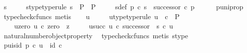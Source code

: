 \begin{isabellebody}
\ s{\isacharprime}{\kern0pt}\ \isanewline
\ \ \ \ s{\isacharprime}{\kern0pt}{\isacharunderscore}{\kern0pt}type{\isacharbrackleft}{\kern0pt}type{\isacharunderscore}{\kern0pt}rule{\isacharbrackright}{\kern0pt}{\isacharcolon}{\kern0pt}\ {\isachardoublequoteopen}s{\isacharprime}{\kern0pt}\ {\isacharcolon}{\kern0pt}\ P\ {\isasymrightarrow}\ P{\isachardoublequoteclose}\ \isanewline
\ \ \ \ s{\isacharprime}{\kern0pt}{\isacharunderscore}{\kern0pt}def{\isacharcolon}{\kern0pt}\ {\isachardoublequoteopen}p{\isacharprime}{\kern0pt}\ {\isasymcirc}\isactrlsub c\ s{\isacharprime}{\kern0pt}\ {\isacharequal}{\kern0pt}\ successor\ {\isasymcirc}\isactrlsub c\ p{\isacharprime}{\kern0pt}{\isachardoublequoteclose}\isanewline
\ \ \ \ \isamarkupfalse%
\ p{\isacharprime}{\kern0pt}{\isacharunderscore}{\kern0pt}uni{\isacharunderscore}{\kern0pt}prop\ \isamarkupfalse%
\ {\isacharparenleft}{\kern0pt}typecheck{\isacharunderscore}{\kern0pt}cfuncs{\isacharcomma}{\kern0pt}\ metis{\isacharparenright}{\kern0pt}\isanewline
\isanewline
\ \ \isamarkupfalse%
\ u\ \isanewline
\ \ \ \ u{\isacharunderscore}{\kern0pt}type{\isacharbrackleft}{\kern0pt}type{\isacharunderscore}{\kern0pt}rule{\isacharbrackright}{\kern0pt}{\isacharcolon}{\kern0pt}\ {\isachardoublequoteopen}u\ {\isacharcolon}{\kern0pt}\ {\isasymnat}\isactrlsub c\ {\isasymrightarrow}\ P{\isachardoublequoteclose}\ \isanewline
\ \ \ \ u{\isacharunderscore}{\kern0pt}zero{\isacharcolon}{\kern0pt}\ {\isachardoublequoteopen}u\ {\isasymcirc}\isactrlsub c\ zero\ {\isacharequal}{\kern0pt}\ z{\isacharprime}{\kern0pt}{\isachardoublequoteclose}\ \isanewline
\ \ \ \ u{\isacharunderscore}{\kern0pt}succ{\isacharcolon}{\kern0pt}\ {\isachardoublequoteopen}u\ {\isasymcirc}\isactrlsub c\ successor\ {\isacharequal}{\kern0pt}\ s{\isacharprime}{\kern0pt}\ {\isasymcirc}\isactrlsub c\ u{\isachardoublequoteclose}\isanewline
\ \ \ \ \isamarkupfalse%
\ natural{\isacharunderscore}{\kern0pt}number{\isacharunderscore}{\kern0pt}object{\isacharunderscore}{\kern0pt}property{}\ \isamarkupfalse%
\ {\isacharparenleft}{\kern0pt}typecheck{\isacharunderscore}{\kern0pt}cfuncs{\isacharcomma}{\kern0pt}\ metis\ s{\isacharprime}{\kern0pt}{\isacharunderscore}{\kern0pt}type{\isacharparenright}{\kern0pt}\isanewline
\isanewline
\ \ \isamarkupfalse%
\ p{\isacharprime}{\kern0pt}{\isacharunderscore}{\kern0pt}u{\isacharunderscore}{\kern0pt}is{\isacharunderscore}{\kern0pt}id{\isacharcolon}{\kern0pt}\ {\isachardoublequoteopen}p{\isacharprime}{\kern0pt}\ {\isasymcirc}\isactrlsub c\ u\ {\isacharequal}{\kern0pt}\ id\ {\isasymnat}\isactrlsub c{\isachardoublequoteclose}\isanewline

\end{isabellebody}
